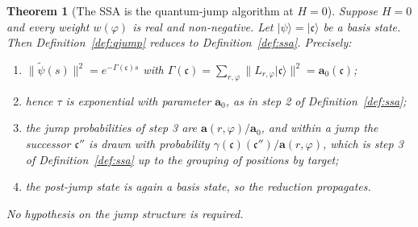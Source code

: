 \documentclass[11pt,a4paper]{article}
\theoremstyle{plain}
\newtheorem{theorem}{Theorem}
\theoremstyle{definition}
\theoremstyle{remark}
\newcommand{\prop}{\mathbf{a}}
\newcommand{\wmap}{w}
\newcommand{\Lop}{L}
\begin{document}
\begin{theorem}[The SSA is the quantum-jump algorithm at $H=0$]
\label{thm:jump-gillespie}
Suppose $H = 0$ and every weight $\wmap(\varphi)$ is real and non-negative. Let
$|\psi\rangle = |\mathfrak{c}\rangle$ be a basis state. Then Definition~\ref{def:qjump} reduces to
Definition~\ref{def:ssa}. Precisely:
\begin{enumerate}[label=(\roman*),leftmargin=2.2em]
\item $\|\tilde\psi(s)\|^2 = e^{-\Gamma(\mathfrak{c})s}$ with
$\Gamma(\mathfrak{c}) = \sum_{r,\varphi}\|\Lop_{r,\varphi}|\mathfrak{c}\rangle\|^2 = \prop_0(\mathfrak{c})$;
\item hence $\tau$ is exponential with parameter $\prop_0$, as in step 2 of
Definition~\ref{def:ssa};
\item the jump probabilities of step 3 are $\prop(r,\varphi)/\prop_0$, and within a jump the
successor $\mathfrak{c}''$ is drawn with probability
$\gamma(\mathfrak{c})(\mathfrak{c}'')/\prop(r,\varphi)$, which is step 3 of
Definition~\ref{def:ssa} up to the grouping of positions by target;
\item the post-jump state is again a basis state, so the reduction propagates.
\end{enumerate}
No hypothesis on the jump structure is required.
\end{theorem}
\end{document}
